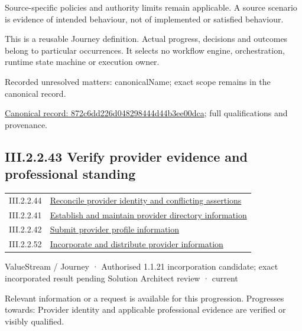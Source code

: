 Source-specific policies and authority limits remain applicable. A source scenario is evidence of intended behaviour, not of implemented or satisfied behaviour.



This is a reusable Journey definition. Actual progress, decisions and outcomes belong to particular occurrences. It selects no workflow engine, orchestration, runtime state machine or execution owner.


{\small Recorded unresolved matters: canonicalName; exact scope remains in the canonical record.}\par
{\footnotesize \href{../../../../continuum/strategy/value-stream/872c6dd226d048298444d44b3ee00dca.md}{Canonical record: 872c6dd226d048298444d44b3ee00dca}; full qualifications and provenance.}\par
\subsection*{III.2.2.43 Verify provider evidence and professional standing}
\label{navigation:III.2.2.43}

\begin{longtable}{p{.22\linewidth}p{.73\linewidth}}
III.2.2.44 & \hyperref[element:3afbc885a4a74b24a1240acb8725bad2]{Reconcile provider identity and conflicting assertions} \\
III.2.2.41 & \hyperref[element:679b0055ee5d42d4a838e35edd3de01f]{Establish and maintain provider directory information} \\
III.2.2.42 & \hyperref[element:872c6dd226d048298444d44b3ee00dca]{Submit provider profile information} \\
III.2.2.52 & \hyperref[element:9eb9f3210d5e4b46ac21463f54e62ab9]{Incorporate and distribute provider information} \\
\end{longtable}
\label{element:733f2f6c9a5e49ceb0107d30bc736945}
{\small ValueStream / Journey · Authorised 1.1.21 incorporation candidate; exact incorporated result pending Solution Architect review · current}\par

Relevant information or a request is available for this progression. Progresses towards: Provider identity and applicable professional evidence are verified or visibly qualified.



